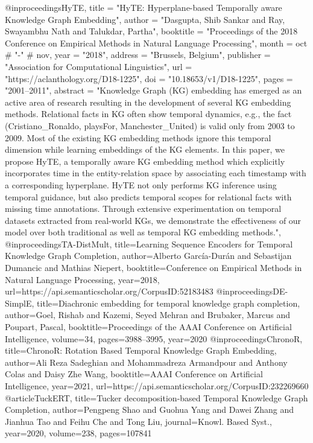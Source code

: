 @inproceedings{HyTE,
    title = "{H}y{TE}: Hyperplane-based Temporally aware Knowledge Graph Embedding",
    author = "Dasgupta, Shib Sankar  and
      Ray, Swayambhu Nath  and
      Talukdar, Partha",
    booktitle = "Proceedings of the 2018 Conference on Empirical Methods in Natural Language Processing",
    month = oct # "-" # nov,
    year = "2018",
    address = "Brussels, Belgium",
    publisher = "Association for Computational Linguistics",
    url = "https://aclanthology.org/D18-1225",
    doi = "10.18653/v1/D18-1225",
    pages = "2001--2011",
    abstract = "Knowledge Graph (KG) embedding has emerged as an active area of research resulting in the development of several KG embedding methods. Relational facts in KG often show temporal dynamics, e.g., the fact (Cristiano{\_}Ronaldo, playsFor, Manchester{\_}United) is valid only from 2003 to 2009. Most of the existing KG embedding methods ignore this temporal dimension while learning embeddings of the KG elements. In this paper, we propose HyTE, a temporally aware KG embedding method which explicitly incorporates time in the entity-relation space by associating each timestamp with a corresponding hyperplane. HyTE not only performs KG inference using temporal guidance, but also predicts temporal scopes for relational facts with missing time annotations. Through extensive experimentation on temporal datasets extracted from real-world KGs, we demonstrate the effectiveness of our model over both traditional as well as temporal KG embedding methods.",
}
@inproceedings{TA-DistMult,
  title={Learning Sequence Encoders for Temporal Knowledge Graph Completion},
  author={Alberto Garc{\'i}a-Dur{\'a}n and Sebastijan Dumancic and Mathias Niepert},
  booktitle={Conference on Empirical Methods in Natural Language Processing},
  year={2018},
  url={https://api.semanticscholar.org/CorpusID:52183483}
}
@inproceedings{DE-SimplE,
  title={Diachronic embedding for temporal knowledge graph completion},
  author={Goel, Rishab and Kazemi, Seyed Mehran and Brubaker, Marcus and Poupart, Pascal},
  booktitle={Proceedings of the AAAI Conference on Artificial Intelligence},
  volume={34},
  pages={3988--3995},
  year={2020}
}
@inproceedings{ChronoR,
  title={ChronoR: Rotation Based Temporal Knowledge Graph Embedding},
  author={Ali Reza Sadeghian and Mohammadreza Armandpour and Anthony Colas and Daisy Zhe Wang},
  booktitle={AAAI Conference on Artificial Intelligence},
  year={2021},
  url={https://api.semanticscholar.org/CorpusID:232269660}
}
@article{TuckERT,
  title={Tucker decomposition-based Temporal Knowledge Graph Completion},
  author={Pengpeng Shao and Guohua Yang and Dawei Zhang and Jianhua Tao and Feihu Che and Tong Liu},
  journal={Knowl. Based Syst.},
  year={2020},
  volume={238},
  pages={107841}
}
